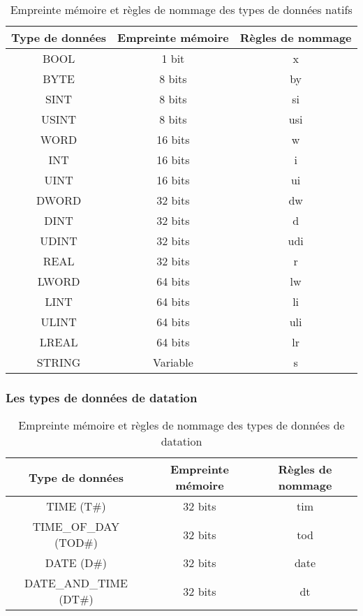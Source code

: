 \begin{table}[htbp]
    \centering
    \begin{tabular}{|c|c|c|}
        \hline
        \rowcolor{gray!30} \textbf{Type de données} & \textbf{Empreinte mémoire} & \textbf{Règles de nommage} \\
        \hline
        BOOL & 1 bit & x \\
        \hline
        BYTE & 8 bits & by \\
        \hline
        SINT & 8 bits & si \\
        \hline
        USINT & 8 bits & usi \\
        \hline
        WORD & 16 bits & w \\
        \hline
        INT & 16 bits & i \\
        \hline
        UINT & 16 bits & ui \\
        \hline
        DWORD & 32 bits & dw \\
        \hline
        DINT & 32 bits & d \\
        \hline
        UDINT & 32 bits & udi \\
        \hline
        REAL & 32 bits & r \\
        \hline
        LWORD & 64 bits & lw \\
        \hline
        LINT & 64 bits & li \\
        \hline
        ULINT & 64 bits & uli \\
        \hline
        LREAL & 64 bits & lr \\
        \hline
        STRING & Variable & s \\
        \hline
    \end{tabular}
    \caption{Empreinte mémoire et règles de nommage des types de données natifs}
\end{table}

\subsubsection{Les types de données de datation}
\begin{table}[htbp]
    \centering
    \begin{tabular}{|c|c|c|}
        \hline
        \rowcolor{gray!30} \textbf{Type de données} & \textbf{Empreinte mémoire} & \textbf{Règles de nommage} \\
        \hline
        TIME (T\#) & 32 bits & tim \\
        \hline
        TIME\_OF\_DAY (TOD\#) & 32 bits & tod \\
        \hline
        DATE (D\#) & 32 bits & date \\
        \hline
        DATE\_AND\_TIME (DT\#) & 32 bits & dt \\
        \hline
    \end{tabular}
    \caption{Empreinte mémoire et règles de nommage des types de données de datation}
\end{table}
